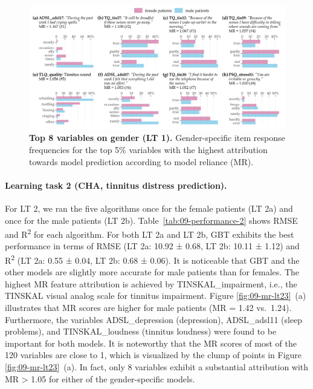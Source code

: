 \documentclass[
  oneside]{book}
\begin{document}
\begin{figure}[htb]

{\centering \includegraphics[width=1\linewidth]{figures/09-lt1-imp-features} 

}

\caption{\textbf{Top 8 variables on gender (LT 1).} Gender-specific item response frequencies for the top 5\% variables with the highest attribution towards model prediction according to model reliance (MR).}\label{fig:09-lt1-imp-features}
\end{figure}

\paragraph*{Learning task 2 (CHA, tinnitus distress prediction).}

For LT 2, we ran the five algorithms once for the female patients (LT 2a) and once for the male patients (LT 2b).
Table~\ref{tab:09-performance-2} shows RMSE and R\textsuperscript{2} for each algorithm.
For both LT 2a and LT 2b, GBT exhibits the best performance in terms of RMSE (LT 2a: 10.92 ± 0.68, LT 2b: 10.11 ± 1.12) and R\textsuperscript{2} (LT 2a: 0.55 ± 0.04, LT 2b: 0.68 ± 0.06).
It is noticeable that GBT and the other models are slightly more accurate for male patients than for females.
The highest MR feature attribution is achieved by TINSKAL\_impairment, i.e., the TINSKAL visual analog scale for tinnitus impairment.
Figure \ref{fig:09-mr-lt23}~(a) illustrates that MR scores are higher for male patients (MR = 1.42 vs.~1.24).
Furthermore, the variables ADSL\_depression (depression), ADSL\_adsl11 (sleep problems), and TINSKAL\_loudness (tinnitus loudness) were found to be important for both models.
It is noteworthy that the MR scores of most of the 120 variables are close to 1, which is visualized by the clump of points in Figure \ref{fig:09-mr-lt23}~(a).
In fact, only 8 variables exhibit a substantial attribution with MR \textgreater{} 1.05 for either of the gender-specific models.
\end{document}
